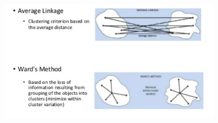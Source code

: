\documentclass[a4paper,12pt]{article}
\begin{document}
%
%
%
%
%





\begin{figure}[h!]
\centering
\includegraphics[width=0.7\linewidth]{images/wardlinkage}

\end{figure}
\end{document}
